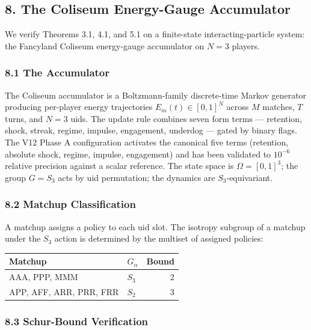 \documentclass[
  11pt,
]{article}
\newcounter{none} %
\begin{document}
\subsection{8. The Coliseum Energy-Gauge
Accumulator}\label{the-coliseum-energy-gauge-accumulator}

We verify Theorems 3.1, 4.1, and 5.1 on a finite-state
interacting-particle system: the Fancyland Coliseum energy-gauge
accumulator on \(N = 3\) players.

\subsubsection{8.1 The Accumulator}\label{the-accumulator}

The Coliseum accumulator is a Boltzmann-family discrete-time Markov
generator producing per-player energy trajectories
\(E_m(t) \in [0, 1]^N\) across \(M\) matches, \(T\) turns, and \(N = 3\)
uids. The update rule combines seven form terms --- retention, shock,
streak, regime, impulse, engagement, underdog --- gated by binary flags.
The V12 Phase A configuration activates the canonical five terms
(retention, absolute shock, regime, impulse, engagement) and has been
validated to \(10^{-6}\) relative precision against a scalar reference.
The state space is \(\Omega = [0, 1]^3\); the group \(G = S_3\) acts by
uid permutation; the dynamics are \(S_3\)-equivariant.

\subsubsection{8.2 Matchup Classification}\label{matchup-classification}

A matchup assigns a policy to each uid slot. The isotropy subgroup of a
matchup under the \(S_3\) action is determined by the multiset of
assigned policies:

{\def\LTcaptype{none} %
\begin{longtable}[]{@{}llr@{}}
\toprule\noalign{}
Matchup & \(G_\alpha\) & Bound \\
\midrule\noalign{}
\endhead
\bottomrule\noalign{}
\endlastfoot
AAA, PPP, MMM & \(S_3\) & 2 \\
APP, AFF, ARR, PRR, FRR & \(S_2\) & 3 \\
\end{longtable}
}

\subsubsection{8.3 Schur-Bound
Verification}\label{schur-bound-verification}
\end{document}
